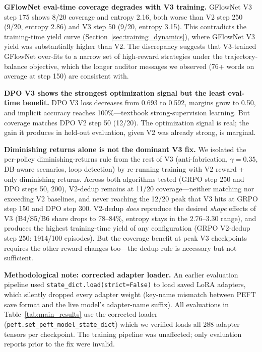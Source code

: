 \documentclass{article}
\begin{document}
\textbf{GFlowNet eval-time coverage degrades with V3 training.}
GFlowNet V3 step 175 shows 8/20 coverage and entropy 2.16, both worse than V2 step 250 (9/20, entropy 2.86) and V3 step 50 (9/20, entropy 3.15). This contradicts the training-time yield curve (Section~\ref{sec:training_dynamics}), where GFlowNet V3 yield was substantially higher than V2. The discrepancy suggests that V3-trained GFlowNet over-fits to a narrow set of high-reward strategies under the trajectory-balance objective, which the longer auditor messages we observed (76+ words on average at step 150) are consistent with.

\textbf{DPO V3 shows the strongest optimization signal but the least eval-time benefit.}
DPO V3 loss decreases from 0.693 to 0.592, margins grow to 0.50, and implicit accuracy reaches 100\%---textbook strong-supervision learning. But coverage matches DPO V2 step 50 (12/20). The optimization signal is real; the gain it produces in held-out evaluation, given V2 was already strong, is marginal.

\textbf{Diminishing returns alone is not the dominant V3 fix.}
We isolated the per-policy diminishing-returns rule from the rest of V3 (anti-fabrication, $\gamma=0.35$, DB-aware scenarios, loop detection) by re-running training with V2 reward + only diminishing returns. Across both algorithms tested (GRPO step 250 and DPO steps 50, 200), V2-dedup remains at 11/20 coverage---neither matching nor exceeding V2 baselines, and never reaching the 12/20 peak that V3 hits at GRPO step 150 and DPO step 300. V2-dedup \emph{does} reproduce the desired \emph{shape} effects of V3 (B4/S5/B6 share drops to 78--84\%, entropy stays in the 2.76--3.30 range), and produces the highest training-time yield of any configuration (GRPO V2-dedup step 250: 1914/100 episodes). But the coverage benefit at peak V3 checkpoints requires the other reward changes too---the dedup rule is necessary but not sufficient.

\textbf{Methodological note: corrected adapter loader.}
An earlier evaluation pipeline used \texttt{state\_dict.load(strict=False)} to load saved LoRA adapters, which silently dropped every adapter weight (key-name mismatch between PEFT save format and the live model's adapter-name suffix). All evaluations in Table~\ref{tab:main_results} use the corrected loader (\texttt{peft.set\_peft\_model\_state\_dict}) which we verified loads all 288 adapter tensors per checkpoint. The training pipeline was unaffected; only evaluation reports prior to the fix were invalid.
\end{document}
